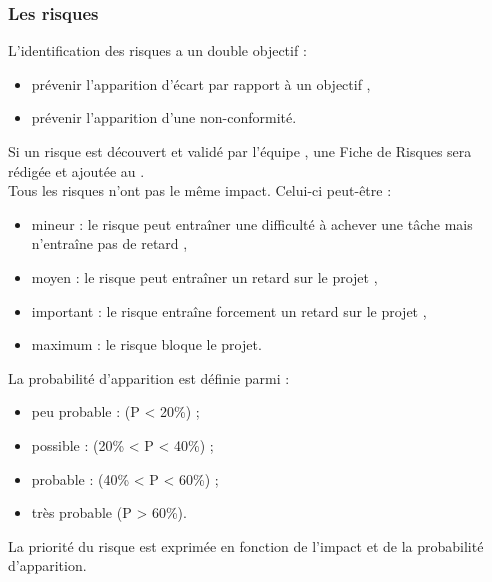 \subsubsection*{Les risques}

L'identification des risques a un double objectif : 
\begin{itemize}
\item prévenir l'apparition d'écart par rapport à un objectif ,
\item prévenir l'apparition d'une non-conformité. \\
\end{itemize}
Si un risque est découvert et validé par l'équipe \PICCourt{}, une Fiche de Risques sera rédigée et ajoutée au \PR.\\

Tous les risques n'ont pas le même impact. Celui-ci peut-être :
\begin{itemize}
\item mineur : le risque peut entraîner une difficulté à achever une tâche mais n'entraîne pas de retard ,
\item moyen : le risque peut entraîner un retard sur le projet ,
\item important : le risque entraîne forcement un retard sur le projet ,
\item maximum : le risque bloque le projet.\\
\end{itemize}

La probabilité d'apparition est définie parmi :
\begin{itemize}
 \item peu probable : (P < 20\%) ;
 \item possible : (20\% < P < 40\%) ;
 \item probable : (40\% < P < 60\%) ;
 \item très probable (P > 60\%).\\
\end{itemize}

La priorité du risque est exprimée en fonction de l'impact et de la probabilité d'apparition. \\

